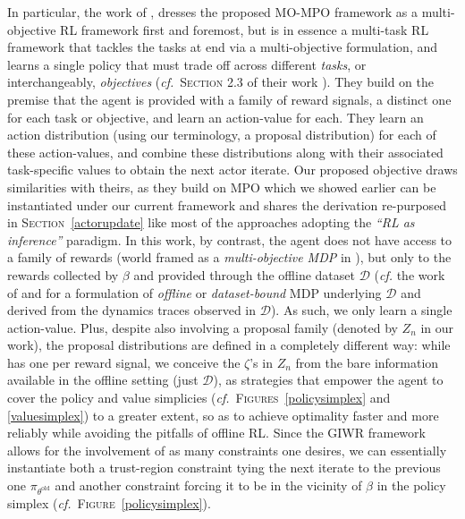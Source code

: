 In particular, the work of \cite{Abdolmaleki2020-gu},
dresses the proposed MO-MPO framework as a multi-objective RL framework first and foremost,
but is in essence a multi-task RL framework that tackles the tasks at end via a multi-objective formulation,
and learns a single policy that must trade off across different \textit{tasks}, or interchangeably,
\textit{objectives} (\textit{cf.}~\textsc{Section 2.3} of their work \cite{Abdolmaleki2020-gu}).
They build on the premise that the agent is provided with a family of reward signals, a distinct one for each task
or objective, and learn an action-value for each.
They learn an action distribution (using our terminology, a proposal distribution) for each of these action-values,
and combine these distributions along with their associated task-specific values to obtain the next actor iterate.
Our proposed objective draws similarities with theirs, as they build on MPO \cite{Abdolmaleki2018-sp}
which we showed earlier can be instantiated under our current framework and shares the derivation re-purposed in
\textsc{Section}~\ref{actorupdate} like most of the approaches adopting the \textit{``RL as inference''}
paradigm. In this work, by contrast, the agent does not have access to a family of rewards
(world framed as a \textit{multi-objective MDP} in \cite{Abdolmaleki2020-gu}), but only
to the rewards collected by $\beta$ and
provided through the offline dataset $\mathcal{D}$
(\textit{cf.} the work of \cite{Fujimoto2018-mj} and \cite{Laroche2019-ar} for a formulation of \textit{offline}
or \textit{dataset-bound} MDP
underlying $\mathcal{D}$ and derived from the dynamics traces observed in $\mathcal{D}$).
As such, we only learn a single action-value.
Plus, despite also involving a proposal family (denoted by $Z_n$ in our work), the proposal distributions
are defined in a completely different way: while \cite{Abdolmaleki2020-gu}
has one per reward signal, we conceive the $\zeta$'s in $Z_n$ from the bare information available in
the offline setting (just $\mathcal{D}$), as strategies that empower the agent to cover the
policy and value simplicies
(\textit{cf.}~\textsc{Figures}~\ref{policysimplex} and \ref{valuesimplex})
to a greater extent, so as to achieve optimality faster and more reliably
while avoiding the pitfalls of offline RL.
Since the GIWR framework allows for the involvement of as many constraints one desires,
we can essentially instantiate both a trust-region constraint tying the next iterate to the previous one
$\pi_{\theta^\text{old}}$ and another constraint forcing it to be in the vicinity of
$\beta$ in the policy simplex (\textit{cf.}~\textsc{Figure}~\ref{policysimplex}).
